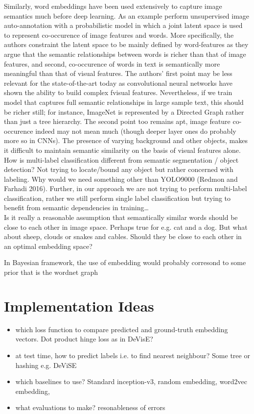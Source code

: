 \documentclass{report}
\begin{document}
Similarly, word embeddings have been used extensively to capture image semantics much before deep learning. As an example \cite{MonayPLSA} perform unsupervised image auto-annotation with a probabilistic model in which a joint latent space is used to represent co-occurence of image features and words. More specifically, the authors constraint the latent space to be mainly defined by word-features as they argue that the semantic relationships between words is richer than that of image features, and second, co-occurence of words in text is semantically more meaningful than that of visual features. The authors' first point may be less relevant for the state-of-the-art today as convolutional neural networks have shown the ability to build complex fvisual features. Nevertheless, if we train model that captures full semantic relationships in large sample text, this should be richer still; for instance, ImageNet is represented by a Directed Graph rather than just a tree hierarchy. The second point too remains apt, image feature co-occurence indeed may not mean much (though deeper layer ones do probably more so in CNNs). The presence of varying background and other objects, makes it difficult to maintain semantic similarity on the basis of visual features alone.  \\

How is multi-label classification different from semantic segmentation / object detection? Not trying to locate/bound any object but rather concerned with labeling. Why would we need something other than YOLO9000 (Redmon and Farhadi 2016). Further, in our approach we are not trying to perform multi-label classification, rather we still perform single label classification but trying to benefit from semantic dependencies in training\dots \\


Is it really a reasonable assumption that semantically similar words should be close to each other in image space. Perhaps true for e.g. cat and a dog. But what about sheep, clouds or snakes and cables. Should they be close to each other in an optimal embedding space? 

In Bayesian framework, the use of embedding would probably corresond to some prior that is the wordnet graph

\newpage

\chapter{Implementation Ideas}
\begin{itemize}
\item which loss function to compare predicted and ground-truth embedding vectors. Dot product hinge loss as in DeVisE? 
\item at test time, how to predict labels i.e. to find nearest neighbour? Some tree or hashing e.g. DeViSE
\item which baselines to use? Standard inception-v3, random embedding, word2vec embedding, 
\item what evaluations to make? resonableness of errors
\end{itemize}
\end{document}
